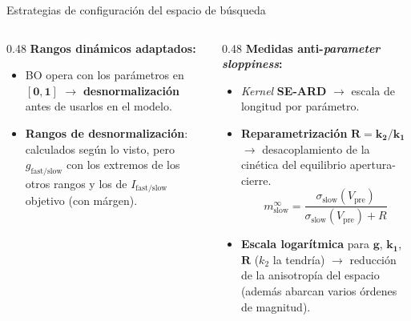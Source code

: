 \documentclass[10pt, aspectratio=169]{beamer}
\begin{document}
\begin{frame}{Estrategias de configuración del espacio de búsqueda}
    \small
    \begin{columns}[t]
        \begin{column}{0.48\textwidth}
            \textbf{Rangos dinámicos adaptados:}
            \begin{itemize}
                \item[] BO opera con los parámetros en $\boldsymbol{[0, 1]}$ $\to$ \textbf{desnormalización} antes de usarlos en el modelo.
                \item[] \textbf{Rangos de desnormalización}: calculados según lo visto, pero $g_{\mathrm{fast/slow}}$ con los extremos de los otros rangos y los de $I_{\mathrm{fast/slow}}$ objetivo (con márgen).
            \end{itemize}
        \end{column}
        \begin{column}{0.48\textwidth}
            \textbf{Medidas anti-\textit{parameter sloppiness}:}
            \begin{itemize}
                \item \textit{Kernel} \textbf{SE-ARD} $\to$ escala de longitud por parámetro.
                \item \textbf{Reparametrización} $\boldsymbol{R = k_2/k_1}$ $\to$ desacoplamiento de la cinética del equilibrio apertura-cierre.
                      \begin{equation*}
                          m_{\mathrm{slow}}^{\infty} = \frac{\sigma_{\mathrm{slow}}(V_{\mathrm{pre}})}{\sigma_{\mathrm{slow}}(V_{\mathrm{pre}}) + R}
                      \end{equation*}
                      \vspace{-0.5em}
                \item \textbf{Escala logarítmica} para $\boldsymbol{g}$, $\boldsymbol{k_1}$, $\boldsymbol{R}$ ($k_2$ la tendría) $\to$ reducción de la anisotropía del espacio (además abarcan varios órdenes de magnitud).
            \end{itemize}
        \end{column}
    \end{columns}
\end{frame}
\end{document}
